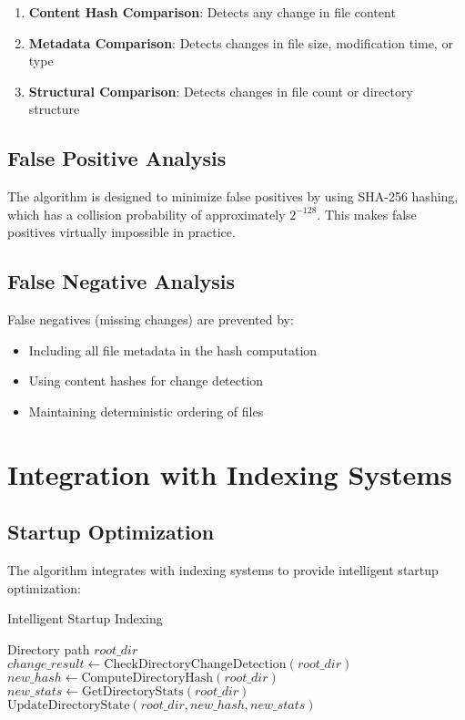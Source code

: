 \documentclass[11pt,a4paper]{article}
\begin{document}
\begin{enumerate}
    \item \textbf{Content Hash Comparison}: Detects any change in file content
    \item \textbf{Metadata Comparison}: Detects changes in file size, modification time, or type
    \item \textbf{Structural Comparison}: Detects changes in file count or directory structure
\end{enumerate}

\subsection{False Positive Analysis}

The algorithm is designed to minimize false positives by using SHA-256 hashing, which has a collision probability of approximately $2^{-128}$. This makes false positives virtually impossible in practice.

\subsection{False Negative Analysis}

False negatives (missing changes) are prevented by:
\begin{itemize}
    \item Including all file metadata in the hash computation
    \item Using content hashes for change detection
    \item Maintaining deterministic ordering of files
\end{itemize}

\section{Integration with Indexing Systems}

\subsection{Startup Optimization}

The algorithm integrates with indexing systems to provide intelligent startup optimization:

\begin{algorithm}[H]
\caption{Intelligent Startup Indexing}
\begin{algorithmic}[1]
\REQUIRE Directory path $root\_dir$
\STATE $change\_result \leftarrow \text{CheckDirectoryChangeDetection}(root\_dir)$
    \STATE {}
    \RETURN
\ENDIF
\STATE {}
\STATE $new\_hash \leftarrow \text{ComputeDirectoryHash}(root\_dir)$
\STATE $new\_stats \leftarrow \text{GetDirectoryStats}(root\_dir)$
\STATE $\text{UpdateDirectoryState}(root\_dir, new\_hash, new\_stats)$
\end{algorithmic}
\end{algorithm}
\end{document}
